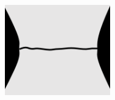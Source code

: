 \begin{frame}
\begin{overlayarea}{\textwidth}{0.4\textwidth}
{\begin{columns}
\begin{column}{0.6\textwidth}
\begin{figure}
\begin{subfigure}{0.4\textwidth}
              \centering
              \includegraphics[width=0.5\textwidth]{theory/figures/no_coupling}
            \end{subfigure}
          \end{figure}
        \end{column}
      \end{columns}
    }
    
\end{overlayarea}
\end{frame}

